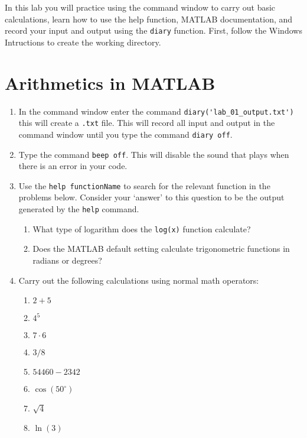 In this lab you will practice using the command window to carry out basic calculations, learn how to use the help function, MATLAB documentation, and record your input and output using the \verb`diary` function. First, follow the Windows Intructions to create the working directory.

\section{Arithmetics in MATLAB}
\begin{enumerate}[(1)]
    \item In the command window enter the command \verb`diary('lab_01_output.txt')` this will create a \verb`.txt` file. This will record all input and output in the command window until you type the command \verb`diary off`.
    \item Type the command \verb`beep off`. This will disable the sound that plays when there is an error in your code.
    \item Use the \verb`help functionName` to search for the relevant function in the problems below. Consider your `answer' to this question to be the output generated by the \verb`help` command.
    \begin{enumerate}
         \item What type of logarithm does the \verb`log(x)` function calculate?
         \item Does the MATLAB default setting calculate trigonometric functions in radians or degrees?
     \end{enumerate}
     \item \label{enum:4}Carry out the following calculations using normal math operators:
        \begin{enumerate}
          \item \label{enum:a} $2+5$
          \item \label{enum:b} $4^5$
          \item \label{enum:c} $7\cdot 6$
          \item \label{enum:d} $3/8$
          \item \label{enum:e} $54460-2342$
          \item \label{enum:f} $\cos(50^{\circ})$
          \item \label{enum:g} $\sqrt{4}$
          \item \label{enum:h} $\ln(3)$

\end{enumerate}
\end{enumerate}
